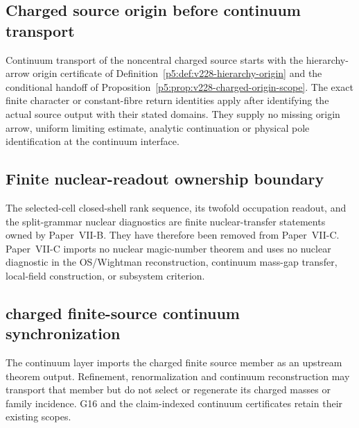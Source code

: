 \documentclass[12pt,a4paper]{article}
\begin{document}

\subsection{Charged source origin before continuum transport}
\label{p7c:sec:v228-charged-origin}
Continuum transport of the noncentral charged source starts with the
hierarchy-arrow origin certificate of
Definition~\ref{p5:def:v228-hierarchy-origin} and the conditional handoff
of Proposition~\ref{p5:prop:v228-charged-origin-scope}.
The exact finite character or constant-fibre return identities apply after
identifying the actual source output with their stated domains.
They supply no missing origin arrow, uniform limiting estimate, analytic
continuation or physical pole identification at the continuum interface.



\subsection{Finite nuclear-readout ownership boundary}
\label{p12:sec:finite-nuclear-readout-ownership-boundary}
The selected-cell closed-shell rank sequence, its twofold occupation readout,
and the split-grammar nuclear diagnostics are finite nuclear-transfer statements
owned by Paper~VII-B.  They have therefore been removed from Paper~VII-C.  Paper~VII-C
imports no nuclear magic-number theorem and uses no nuclear diagnostic in the
OS/Wightman reconstruction, continuum mass-gap transfer, local-field
construction, or subsystem criterion.


\subsection{charged finite-source continuum synchronization}
\label{p12:sec:v294-charged-source-sync}
The continuum layer imports the charged finite source member as an upstream
theorem output.  Refinement, renormalization and continuum reconstruction may
transport that member but do not select or regenerate its charged masses or
family incidence.  G16 and the claim-indexed continuum certificates retain
their existing scopes.
\end{document}
